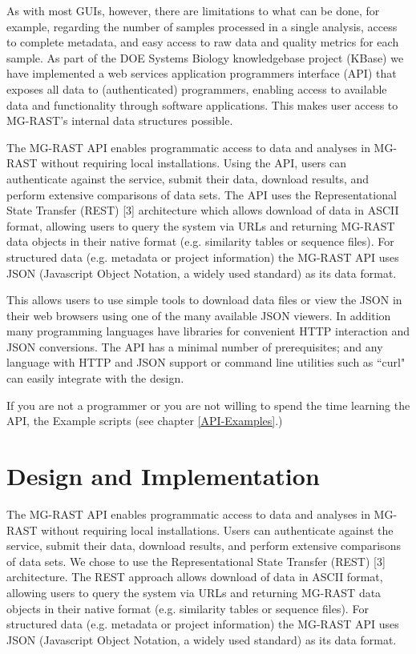 As with most GUIs, however, there are limitations to what can be done, for example, regarding the number of samples processed in a single analysis, access to complete metadata, and easy access to raw data and quality metrics for each sample. As part of the DOE Systems Biology knowledgebase project (KBase) we have implemented a web services application programmers interface (API) that exposes all data to (authenticated) programmers, enabling access to available data and functionality through software applications. This makes user access to MG-RAST's internal data structures possible. 

The MG-RAST API enables programmatic access to data and analyses in MG-RAST without requiring local installations. Using the API, users can authenticate against the service, submit their data, download results, and perform extensive comparisons of data sets. The API uses the Representational State Transfer (REST) [3] architecture which allows download of data in ASCII format, allowing users to query the system via URLs and returning MG-RAST data objects in their native format (e.g. similarity tables or sequence files). For structured data (e.g. metadata or project information) the MG-RAST API uses JSON (Javascript Object Notation, a widely used standard) as its data format. 

This allows users to use simple tools to download data files or view the JSON in their web browsers using one of the many available JSON viewers. In addition many programming languages have libraries for convenient HTTP interaction and JSON conversions. The API has a minimal number of prerequisites; and any language with HTTP and JSON support or command line utilities such as ``curl" can easily integrate with the design. 

If you are not a programmer or you are not willing to spend the time learning the API, the Example scripts (see chapter \ref{API-Examples}.) 
\section{Design and Implementation}
The MG-RAST API enables programmatic access to data and analyses in MG-RAST without requiring local installations. Users can authenticate against the service, submit their data, download results, and perform extensive comparisons of data sets. We chose to use the Representational State Transfer (REST) [3] architecture. The REST approach allows download of data in ASCII format, allowing users to query the system via URLs and returning  MG-RAST data objects in their native format (e.g. similarity tables or sequence files). For structured data (e.g. metadata or project information) the MG-RAST API uses JSON (Javascript Object Notation, a widely used standard) as its data format. 

